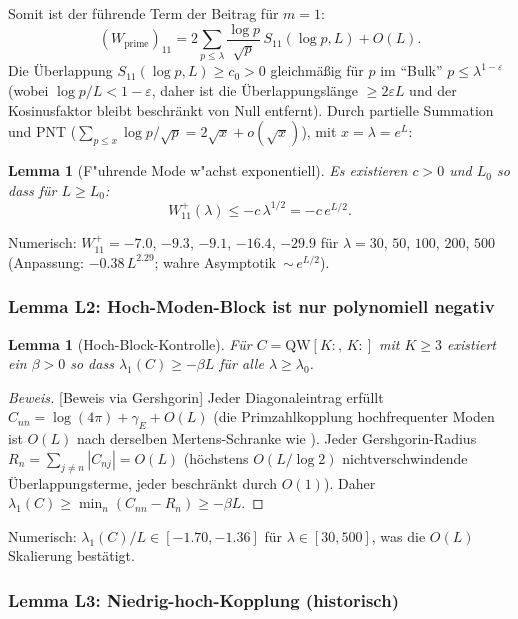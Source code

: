 ﻿\documentclass[12pt,a4paper]{article}
\newtheorem{lemma}[theorem]{Lemma}
\theoremstyle{definition}
\theoremstyle{remark}
\begin{document}
Somit ist der führende Term der Beitrag für $m = 1$:
\begin{equation}
\label{eq:W11-m1}
  (W_{\mathrm{prime}})_{11} = 2\sum_{p \leq \lambda} \frac{\log p}{\sqrt{p}}\,S_{11}(\log p, L) + O(L).
\end{equation}
Die Überlappung $S_{11}(\log p, L) \geq c_0 > 0$ gleichmäßig für $p$ im ``Bulk'' $p \leq \lambda^{1-\varepsilon}$ (wobei $\log p / L < 1 - \varepsilon$, daher ist die Überlappungslänge $\geq 2\varepsilon L$ und der Kosinusfaktor bleibt beschränkt von Null entfernt). Durch partielle Summation und PNT ($\sum_{p \leq x} \log p / \sqrt{p} = 2\sqrt{x} + o(\sqrt{x})$), mit $x = \lambda = e^L$:

\begin{lemma}[F"uhrende Mode w"achst exponentiell]
\label{lem:L1}
Es existieren $c > 0$ und $L_0$ so dass für $L \geq L_0$:
\[
  W_{11}^+(\lambda) \leq -c\,\lambda^{1/2} = -c\,e^{L/2}.
\]
\end{lemma}

\noindent Numerisch: $W_{11}^+ = -7.0$, $-9.3$, $-9.1$, $-16.4$, $-29.9$ für $\lambda = 30$, $50$, $100$, $200$, $500$ (Anpassung: $-0.38\,L^{2.29}$; wahre Asymptotik~${\sim}\, e^{L/2}$).

\subsubsection{Lemma L2: Hoch-Moden-Block ist nur polynomiell negativ}

\begin{lemma}[Hoch-Block-Kontrolle]
\label{lem:L2}
Für $C = \mathrm{QW}[K{:},\,K{:}]$ mit $K \geq 3$ existiert ein $\beta > 0$ so dass $\lambda_1(C) \geq -\beta L$ für alle $\lambda \geq \lambda_0$.
\end{lemma}
\begin{proof}[Beweis][Beweis via Gershgorin]
Jeder Diagonaleintrag erfüllt $C_{nn} = \log(4\pi) + \gamma_E + O(L)$ (die Primzahlkopplung hochfrequenter Moden ist $O(L)$ nach derselben Mertens-Schranke wie ). Jeder Gershgorin-Radius $R_n = \sum_{j \neq n} |C_{nj}| = O(L)$ (höchstens $O(L/\log 2)$ nichtverschwindende Überlappungsterme, jeder beschränkt durch $O(1)$). Daher $\lambda_1(C) \geq \min_n(C_{nn} - R_n) \geq -\beta L$.
\end{proof}

\noindent Numerisch: $\lambda_1(C)/L \in [-1.70, -1.36]$ für $\lambda \in [30, 500]$, was die $O(L)$ Skalierung bestätigt.

\subsubsection{Lemma L3: Niedrig-hoch-Kopplung (historisch)}
\end{document}
